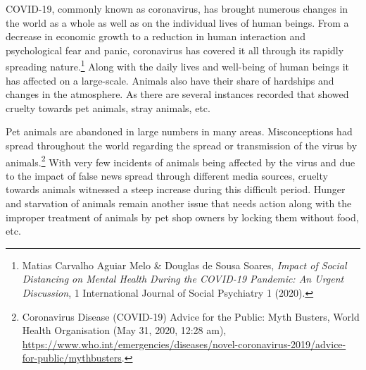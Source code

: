\setcounter{figure}{0}
\setcounter{table}{0}
\setcounter{footnote}{0}




\begin{multicols}{2}


\noi
COVID-19, commonly known as coronavirus, has brought numerous changes in the world as
a whole as well as on the individual lives of human beings. From a decrease in economic
growth to a reduction in human interaction and psychological fear and panic, coronavirus has
covered it all through its rapidly spreading nature.\footnote{Matias Carvalho Aguiar Melo \& Douglas de Sousa Soares, \textit{Impact of Social Distancing on Mental Health
During the COVID-19 Pandemic: An Urgent Discussion}, 1 International Journal of Social Psychiatry 1 (2020).}
 Along with the daily lives and well-being
of human beings it has affected on a large-scale. Animals also have their share of hardships
and changes in the atmosphere. As there are several instances recorded that showed cruelty
towards pet animals, stray animals, etc. 

\noi
Pet animals are abandoned in large numbers in many areas. Misconceptions had spread
throughout the world regarding the spread or transmission of the virus by animals.\footnote{Coronavirus Disease (COVID-19) Advice for the Public: Myth Busters, World Health Organisation (May 31,
2020, 12:28 am), \url{https://www.who.int/emergencies/diseases/novel-coronavirus-2019/advice-for-public/mythbusters}. }
 With very
few incidents of animals being affected by the virus and due to the impact of false news
spread through different media sources, cruelty towards animals witnessed a steep increase
during this difficult period. Hunger and starvation of animals remain another issue that needs
action along with the improper treatment of animals by pet shop owners by locking them
without food, etc.


\end{multicols}
